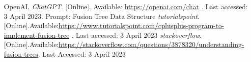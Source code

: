 \documentclass{article}
\begin{document}
\begin{thebibliography}{9}
  OpenAI. \textit{ChatGPT}. [Online]. Available: \url{https://openai.com/chat} . Last accessed: 3 April 2023. Prompt: Fusion Tree Data Structure
  \textit{tutorialspoint}.\hspace*{2mm}[Online].\hspace*{2mm}Available:\hspace*{1mm}\url{https://www.tutorialspoint.com/cplusplus-program-to-implement-fusion-tree} . Last accessed: 3 April 2023
  \textit{stackoverflow}.\hspace*{2mm}[Online].\hspace*{2mm}Available:\hspace*{1mm}\url{https://stackoverflow.com/questions/3878320/understanding-fusion-trees}. Last Accessed: 3 April 2023
  \end{thebibliography}
\end{document}
